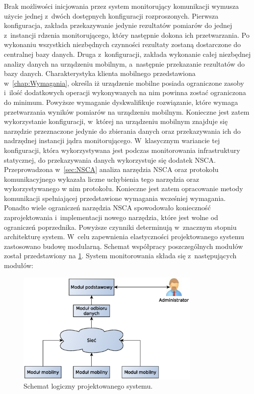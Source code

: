 Brak możliwości inicjowania przez system monitorujący komunikacji
wymusza użycie jednej z~dwóch dostępnych konfiguracji
rozproszonych. Pierwsza konfiguracja, zakłada przekazywanie jedynie
rezultatów pomiarów do jednej z~instancji rdzenia monitorującego,
który następnie dokona ich przetwarzania. Po wykonaniu wszystkich
niezbędnych czynności rezultaty zostaną dostarczone do centralnej bazy
danych. Druga z~konfiguracji, zakłada wykonanie całej niezbędnej
analizy danych na urządzeniu mobilnym, a~następnie przekazanie
rezultatów do bazy danych. Charakterystyka klienta mobilnego
przedstawiona w~\ref{chap:Wymagania}, określa iż urządzenie mobilne
posiada ograniczone zasoby i~ilość dodatkowych operacji wykonywanych
na nim powinna zostać ograniczona do minimum. Powyższe wymaganie
dyskwalifikuje rozwiązanie, które wymaga przetwarzania wyników
pomiarów na urządzeniu mobilnym. Konieczne jest zatem wykorzystanie
konfiguracji, w~której na urządzeniu mobilnym znajduje się narzędzie
przeznaczone jedynie do zbierania danych oraz przekazywania ich do
nadrzędnej instancji jądra monitorującego. W~klasycznym wariancie tej
konfiguracji, która wykorzystywana jest podczas monitorowania
infrastruktury statycznej, do przekazywania danych wykorzystuje się
dodatek NSCA. Przeprowadzona w~\ref{sec:NSCA} analiza narzędzia NSCA
oraz protokołu komunikacyjnego wykazała liczne uchybienia tego
narzędzia oraz wykorzystywanego w nim protokołu. Konieczne jest zatem
opracowanie metody komunikacji spełniającej przedstawione wymagania
wcześniej wymagania. Ponadto wiele ograniczeń narzędzia NSCA
spowodowało konieczność zaprojektowania i~implementacji nowego
narzędzia, które jest wolne od ograniczeń poprzednika. Powyższe
czynniki determinują w~znacznym stopniu architekturę system. W~celu
zapewnienia elastyczności projektowanego systemu zastosowano budowę
modularną. Schemat współpracy poszczególnych modułów został
przedstawiony na \ref{fig:archCalosci}. System monitorowania składa się
z~następujących modułów:

\begin{figure}[ht]
  \caption{Schemat logiczny projektowanego systemu.}
  \label{fig:archCalosci}
  \centering
\includegraphics[width=0.8\textwidth]{img/archCalosci}
\end{figure}

